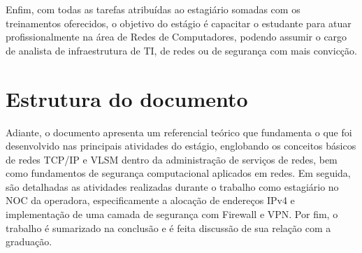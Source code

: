     Enfim, com todas as tarefas atribuídas ao estagiário somadas com os treinamentos oferecidos, o objetivo do estágio é capacitar o estudante para atuar profissionalmente na área de Redes de Computadores, podendo assumir o cargo de analista de infraestrutura de TI, de redes ou de segurança com mais convicção.

\section{Estrutura do documento}

    Adiante, o documento apresenta um referencial teórico que fundamenta o que foi desenvolvido nas principais atividades do estágio, englobando os conceitos básicos de redes TCP/IP e VLSM dentro da administração de serviços de redes, bem como fundamentos de segurança computacional aplicados em redes. Em seguida, são detalhadas as atividades realizadas durante o trabalho como estagiário no NOC da operadora, especificamente a alocação de endereços IPv4 e implementação de uma camada de segurança com Firewall e VPN. Por fim, o trabalho é sumarizado na conclusão e é feita discussão de sua relação com a graduação.
